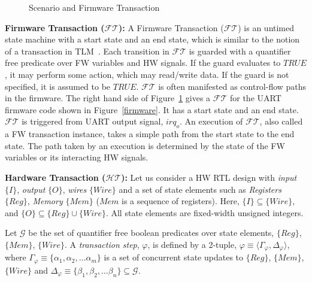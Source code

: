 \documentclass[sigconf]{acmart}
\newcommand{\Omit}[1]{}
\begin{document}
\Omit{ 
\textbf{Use case:}
A {\em Use case} is a set of scenarios that satisfy 
a particular goal. A use case completes successfully 
when that goal is satisfied. A complete set of use cases 
defines all the behaviors required of the system. For example, 
a use case in case of UART  may be to transmit 
the data through the serial port. A scenario is an 
instance of a use case. 
}
%
\begin{figure}[t]
\caption{Scenario and Firmware Transaction
\label{fig:st}}
\end{figure}

\textbf{Firmware Transaction ($\mathcal{FT}$):} 
A Firmware Transaction ($\mathcal{FT}$) is an untimed state machine 
with a start state and an end state, which is similar to the notion of 
a transaction in TLM~\cite{codes14}. 
Each transition in $\mathcal{FT}$ is guarded with a quantifier free predicate
over FW variables and HW signals.
If the guard evaluates to $TRUE$, it may perform some action, which may  
read/write data. If the guard is not specified, it is assumed to be $TRUE$.
$\mathcal{FT}$ is often manifested as control-flow paths in the firmware. 
The right hand side of Figure~\ref{fig:st} gives a 
$\mathcal{FT}$ for the UART firmware code shown in Figure~\ref{firmware}. 
It has a start state and an end state. $\mathcal{FT}$ is triggered from 
UART output signal, $irq_o$. An execution of $\mathcal{FT}$, also called a 
FW transaction instance, takes a simple path from the start state to the end state. 
The path taken by an execution is determined by the state of 
the FW variables or its interacting HW signals. 


\textbf{Hardware Transaction ($\mathcal{HT}$):} 
Let us consider a HW RTL design with \textit{input} $\{I\}$, 
\textit{output} $\{O\}$, \textit{wires} $\{Wire\}$ and a set of 
state elements such as \textit{Registers} $\{Reg\}$, \textit{Memory}
$\{Mem\}$ ($Mem$ is a sequence of registers). Here, 
$\{I\} \subseteq \{Wire\}$, and $\{O\} \subseteq \{Reg\} \cup \{Wire\}$.
All state elements are fixed-width unsigned integers. 

Let $\mathcal{G}$ be the set of quantifier free boolean predicates over 
state elements, $\{Reg\}$, $\{Mem\}$, $\{Wire\}$.  
A {\em transaction step}, $\varphi$, is defined by a 2-tuple,
$\varphi \equiv \langle \Gamma_{\varphi}, \Delta_{\varphi} \rangle$, where 
$\Gamma_{\varphi} \equiv \{\alpha_1, \alpha_2, \ldots \alpha_{m}\}$
is a set of concurrent state updates to $\{Reg\}$, $\{Mem\}$, $\{Wire\}$ 
and $\Delta_{\varphi} \equiv \{\beta_1, \beta_2, \ldots \beta_{n}\} \subseteq
\mathcal{G}$.
\end{document}
